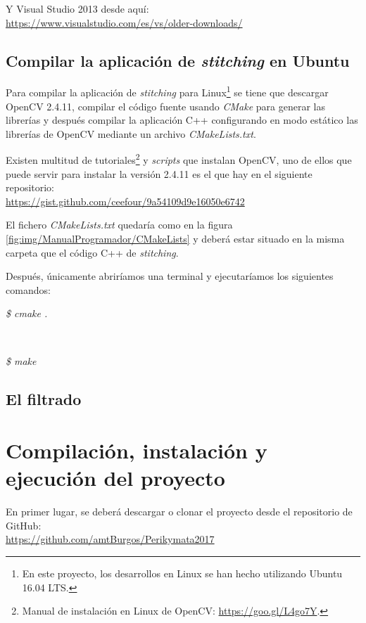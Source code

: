 Y Visual Studio 2013 desde aquí: \\
\url{https://www.visualstudio.com/es/vs/older-downloads/}


\subsection{Compilar la aplicación de \textit{stitching} en Ubuntu}

Para compilar la aplicación de \textit{stitching} para Linux\footnote{En este proyecto, los desarrollos en Linux se han hecho utilizando Ubuntu 16.04 LTS.} se tiene que descargar OpenCV 2.4.11, compilar el código fuente usando \textit{CMake} para generar las librerías y después compilar la aplicación C++ configurando en modo estático las librerías de OpenCV mediante un archivo \textit{CMakeLists.txt}.

Existen multitud de tutoriales\footnote{Manual de instalación en Linux de OpenCV: \url{https://goo.gl/L4go7Y}.} y \textit{scripts} que instalan OpenCV, uno de ellos que puede servir para instalar la versión 2.4.11 es el que hay en el siguiente repositorio: \\
\url{https://gist.github.com/ceefour/9a54109d9e16050e6742}

El fichero \textit{CMakeLists.txt} quedaría como en la figura \ref{fig:img/ManualProgramador/CMakeLists} y deberá estar situado en la misma carpeta que el código C++ de \textit{stitching}.


Después, únicamente abriríamos una terminal y ejecutaríamos los siguientes comandos:\\
\centerline{\textit{\$ cmake .}}\\
\centerline{\textit{\$ make}}

\subsection{El filtrado}

\section{Compilación, instalación y ejecución del proyecto}

En primer lugar, se deberá descargar o clonar el proyecto desde el repositorio de GitHub: \\ \url{https://github.com/amtBurgos/Perikymata2017}

